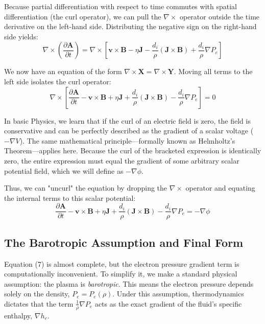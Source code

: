 \documentclass[11pt, a4paper]{article}
\begin{document}
Because partial differentiation with respect to time commutes with spatial differentiation (the curl operator), we can pull the $\nabla \times$ operator outside the time derivative on the left-hand side. Distributing the negative sign on the right-hand side yields:
\begin{equation}
    \nabla \times \left( \frac{\partial \mathbf{A}}{\partial t} \right) = \nabla \times \left[ \mathbf{v} \times \mathbf{B} - \eta \mathbf{J} - \frac{d_i}{\rho}(\mathbf{J} \times \mathbf{B}) + \frac{d_i}{\rho} \nabla P_e \right]
\end{equation}

We now have an equation of the form $\nabla \times \mathbf{X} = \nabla \times \mathbf{Y}$. Moving all terms to the left side isolates the curl operator:
\begin{equation}
    \nabla \times \left[ \frac{\partial \mathbf{A}}{\partial t} - \mathbf{v} \times \mathbf{B} + \eta \mathbf{J} + \frac{d_i}{\rho}(\mathbf{J} \times \mathbf{B}) - \frac{d_i}{\rho} \nabla P_e \right] = 0
\end{equation}

In basic Physics, we learn that if the curl of an electric field is zero, the field is conservative and can be perfectly described as the gradient of a scalar voltage ($- \nabla V$). The same mathematical principle—formally known as Helmholtz's Theorem—applies here. Because the curl of the bracketed expression is identically zero, the entire expression must equal the gradient of some arbitrary scalar potential field, which we will define as $-\nabla \phi$. 

Thus, we can "uncurl" the equation by dropping the $\nabla \times$ operator and equating the internal terms to this scalar potential:
\begin{equation}
    \frac{\partial \mathbf{A}}{\partial t} - \mathbf{v} \times \mathbf{B} + \eta \mathbf{J} + \frac{d_i}{\rho}(\mathbf{J} \times \mathbf{B}) - \frac{d_i}{\rho} \nabla P_e = -\nabla \phi
\end{equation}

\subsection{The Barotropic Assumption and Final Form}
Equation (7) is almost complete, but the electron pressure gradient term is computationally inconvenient. To simplify it, we make a standard physical assumption: the plasma is \textit{barotropic}. This means the electron pressure depends solely on the density, $P_e = P_e(\rho)$. Under this assumption, thermodynamics dictates that the term $\frac{1}{\rho}\nabla P_e$ acts as the exact gradient of the fluid's specific enthalpy, $\nabla h_e$. 
\end{document}
